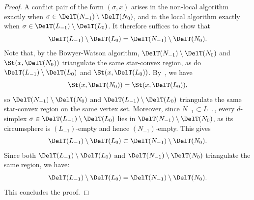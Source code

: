 \begin{proof}
A conflict pair of the form $(\sigma,x)$ arises in the non-local algorithm exactly when $\sigma\in \DelT(N_{-1}) \setminus \DelT(N_0)$, and in the local algorithm exactly when 
 $\sigma \in \DelT(L_{-1}) \setminus \DelT(L_0)$.  
        It therefore suffices to show that
        \[\DelT(L_{-1}) \setminus \DelT(L_0) = \DelT(N_{-1}) \setminus \DelT(N_0).\] 
        Note that, by the Bowyer-Watson algorithm, $\DelT(N_{-1}) \setminus \DelT(N_0)$ and $\St(x, \DelT(N_0))$
        triangulate the same star-convex region, as do $\DelT(L_{-1}) \setminus \DelT(L_0)$
        and $\St(x, \DelT(L_0))$. 
        By~, we have
        \[\St(x, \DelT(N_0)) = \St(x, \DelT(L_0)),\]
        so $\DelT(N_{-1}) \setminus \DelT(N_0)$ and $\DelT(L_{-1}) \setminus \DelT(L_0)$
        triangulate the same star-convex region on the same vertex set.
        Moreover, since $N_{-1} \subset L_{-1}$, every $d$-simplex $\sigma \in \DelT(L_{-1}) \setminus \DelT(L_0)$
        lies in $\DelT(N_{-1}) \setminus \DelT(N_0)$, as its circumsphere is $(L_{-1})$-empty
        and hence $(N_{-1})$-empty. 
        This gives
        \[\DelT(L_{-1}) \setminus \DelT(L_0) \subset \DelT(N_{-1}) \setminus \DelT(N_0).\]
        Since both $\DelT(L_{-1}) \setminus \DelT(L_0)$ and $\DelT(N_{-1}) \setminus \DelT(N_0)$
        triangulate the same region, we have:
        \[\DelT(L_{-1}) \setminus \DelT(L_0) = \DelT(N_{-1}) \setminus \DelT(N_0).\]        
    This concludes the proof.
\end{proof}
%
%
%
%
